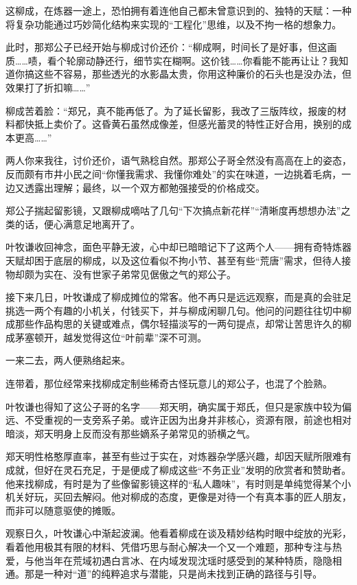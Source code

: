这柳成，在炼器一途上，恐怕拥有着连他自己都未曾意识到的、独特的天赋：一种将复杂功能通过巧妙简化结构来实现的“工程化”思维，以及不拘一格的想象力。

此时，那郑公子已经开始与柳成讨价还价：“柳成啊，时间长了是好事，但这画质……啧，看个轮廓动静还行，细节实在糊啊。这价钱……你看能不能再让让？我知道你搞这些不容易，那些透光的水影晶太贵，你用这种廉价的石头也是没办法，但效果打了折扣嘛……”

柳成苦着脸：“郑兄，真不能再低了。为了延长留影，我改了三版阵纹，报废的材料都快抵上卖价了。这昏黄石虽然成像差，但感光蓄灵的特性正好合用，换别的成本更高……”

两人你来我往，讨价还价，语气熟稔自然。那郑公子哥全然没有高高在上的姿态，反而颇有市井小民之间“你懂我需求、我懂你难处”的实在味道，一边挑着毛病，一边又透露出理解；最终，以一个双方都勉强接受的价格成交。

郑公子揣起留影镜，又跟柳成嘀咕了几句“下次搞点新花样”“清晰度再想想办法”之类的话，便心满意足地离开了。

叶牧谦收回神念，面色平静无波，心中却已暗暗记下了这两个人——拥有奇特炼器天赋却困于底层的柳成，以及这位看似不拘小节、甚至有些“荒唐”需求，但待人接物却颇为实在、没有世家子弟常见倨傲之气的郑公子。

\vspace{2em}

接下来几日，叶牧谦成了柳成摊位的常客。他不再只是远远观察，而是真的会驻足挑选一两个有趣的小机关，付钱买下，并与柳成闲聊几句。他问的问题往往切中柳成那些作品构思的关键或难点，偶尔轻描淡写的一两句提点，却常让苦思许久的柳成茅塞顿开，越发觉得这位“叶前辈”深不可测。

一来二去，两人便熟络起来。

连带着，那位经常来找柳成定制些稀奇古怪玩意儿的郑公子，也混了个脸熟。

叶牧谦也得知了这公子哥的名字——郑天明，确实属于郑氏，但只是家族中较为偏远、不受重视的一支旁系子弟。或许正因为出身并非核心，资源有限，前途也相对暗淡，郑天明身上反而没有那些嫡系子弟常见的骄横之气。

郑天明性格憨厚直率，甚至有些过于实在，对炼器杂学感兴趣，却因天赋所限难有成就，但好在灵石充足，于是便成了柳成这些“不务正业”发明的欣赏者和赞助者。他来找柳成，有时是为了些像留影镜这样的“私人趣味”，有时则是单纯觉得某个小机关好玩，买回去解闷。他对柳成的态度，更像是对待一个有真本事的匠人朋友，而非可以随意驱使的摊贩。

观察日久，叶牧谦心中渐起波澜。他看着柳成在谈及精妙结构时眼中绽放的光彩，看着他用极其有限的材料、凭借巧思与耐心解决一个又一个难题，那种专注与热爱，与他当年在荒域初遇白言冰、在内域发现沈瑶时感受到的某种特质，隐隐相通。那是一种对“道”的纯粹追求与潜能，只是尚未找到正确的路径与引导。

